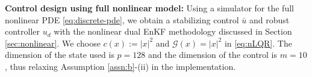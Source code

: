 \documentclass[10pt,a4paper]{amsart}
\newcommand{\todo}[1]{{\color{blue} #1}}
\begin{document}






\noindent \textbf{Control design using full nonlinear model:}
Using a simulator for the full nonlinear PDE \eqref{eq:discrete-pde}, we obtain a stabilizing control $\bar{u}$ and robust controller $u_d$ with the nonlinear dual EnKF methodology discussed in Section \ref{sec:nonlinear}. We choose $c(x) := |x|^2$ and $\mathcal{G}(x) = |x|^2$ in \eqref{eq:nLQR}. 
The dimension of the state used is $p=128$ and the dimension of the control is $m=10$, thus relaxing Assumption \ref{assn:b}-(ii) in the implementation. 
\end{document}
